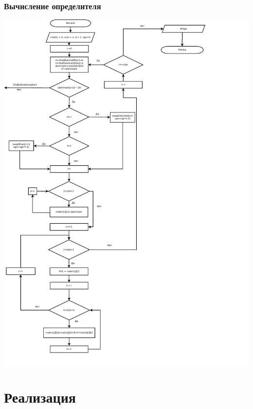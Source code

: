 \documentclass[a4paper,11pt]{article}
\begin{document}
\section*{Вычисление определителя}
 \includegraphics[scale=0.75]{flowchart2.pdf}


\newpage
\part*{Реализация}

\newpage

 
\newpage

 
\end{document}
